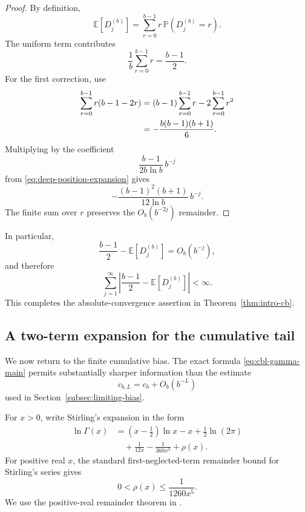 \documentclass[11pt]{article}
\theoremstyle{definition}
\theoremstyle{remark}
\begin{document}
\begin{proof}
By definition,
\[
    \mathbb E[D_j^{(b)}]
    =
    \sum_{r=0}^{b-1}
    r\,\mathbb P(D_j^{(b)}=r).
\]
The uniform term contributes
\[
    \frac1b
    \sum_{r=0}^{b-1}r
    =
    \frac{b-1}{2}.
\]
For the first correction, use
\begin{align}
    \sum_{r=0}^{b-1}
    r(b-1-2r)
    &=
    (b-1)\sum_{r=0}^{b-1}r
    -
    2\sum_{r=0}^{b-1}r^2
    \notag\\
    &=
    -\frac{b(b-1)(b+1)}{6}.
    \label{eq:r-correction-sum}
\end{align}
Multiplying by the coefficient
\[
    \frac{b-1}{2b\ln b}\,b^{-j}
\]
from
\eqref{eq:deep-position-expansion}
gives
\[
    -
    \frac{(b-1)^2(b+1)}
         {12\ln b}\,b^{-j}.
\]
The finite sum over \(r\) preserves the
\(O_b(b^{-2j})\) remainder.
\end{proof}

In particular,
\begin{equation}
    \frac{b-1}{2}
    -
    \mathbb E[D_j^{(b)}]
    =
    O_b(b^{-j}),
    \label{eq:bias-geometric-decay}
\end{equation}
and therefore
\[
    \sum_{j=1}^{\infty}
    \left|
        \frac{b-1}{2}
        -
        \mathbb E[D_j^{(b)}]
    \right|
    <
    \infty.
\]
This completes the absolute-convergence assertion in
Theorem~\ref{thm:intro-cb}.


\subsection{A two-term expansion for the cumulative tail}
\label{subsec:cumulative-tail-expansion}

We now return to the finite cumulative bias.
The exact formula
\eqref{eq:cbl-gamma-main} permits substantially sharper information
than the estimate
\[
    c_{b,L}=c_b+O_b(b^{-L})
\]
used in Section~\ref{subsec:limiting-bias}.

For \(x>0\), write Stirling's expansion in the form
\begin{equation}
\begin{aligned}
    \ln\Gamma(x)
    &=
    \left(x-\frac12\right)\ln x
    -
    x
    +
    \frac12\ln(2\pi)
    \\
    &\quad+
    \frac{1}{12x}
    -
    \frac{1}{360x^3}
    +
    \rho(x).
\end{aligned}
\label{eq:stirling-two-term}
\end{equation}
For positive real \(x\), the standard first-neglected-term remainder
bound for Stirling's series gives
\begin{equation}
    0<\rho(x)
    \le
    \frac{1}{1260x^5}.
    \label{eq:stirling-rho-bound}
\end{equation}
We use the positive-real remainder theorem in
\cite[\S5.11(i)--(ii)]{DLMFStirling}.
\end{document}

